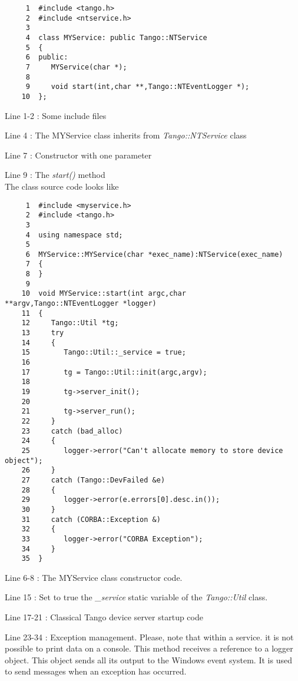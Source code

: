 \begin{verbatim}
     1  #include <tango.h>
     2  #include <ntservice.h>
     3  
     4  class MYService: public Tango::NTService
     5  {
     6  public:
     7     MYService(char *);
     8  
     9     void start(int,char **,Tango::NTEventLogger *);
    10  };
\end{verbatim}




Line 1-2 : Some include files

Line 4 : The MYService class inherits from \emph{Tango::NTService}
class

Line 7 : Constructor with one parameter

Line 9 : The \emph{start()} method\\


The class source code looks like


\begin{verbatim}
     1  #include <myservice.h>
     2  #include <tango.h>
     3  
     4  using namespace std;
     5  
     6  MYService::MYService(char *exec_name):NTService(exec_name)
     7  {
     8  }
     9  
    10  void MYService::start(int argc,char **argv,Tango::NTEventLogger *logger)
    11  {
    12     Tango::Util *tg;
    13     try
    14     {
    15        Tango::Util::_service = true;
    16  
    17        tg = Tango::Util::init(argc,argv);
    18  
    19        tg->server_init();
    20  
    21        tg->server_run();
    22     }
    23     catch (bad_alloc)
    24     {
    25        logger->error("Can't allocate memory to store device object");
    26     }
    27     catch (Tango::DevFailed &e)
    28     {
    29        logger->error(e.errors[0].desc.in());
    30     }
    31     catch (CORBA::Exception &)
    32     {
    33        logger->error("CORBA Exception");
    34     }
    35  }
\end{verbatim}




Line 6-8 : The MYService class constructor code.

Line 15 : Set to true the \emph{\_service} static variable of the
\emph{Tango::Util} class.

Line 17-21 : Classical Tango device server startup code

Line 23-34 : Exception management. Please, note that within a service.
it is not possible to print data on a console. This method receives
a reference to a logger object. This object sends all
its output to the Windows event system. It is used to
send messages when an exception has occurred.


